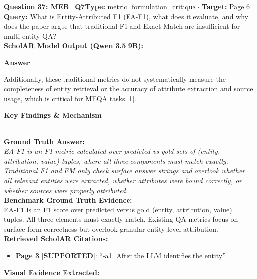 \documentclass[10pt,a4paper]{article}
\begin{document}
\begin{tcolorbox}[questionbox]
{\noindent\bfseries\large\color{navy} Question 37: MEB\_Q7}\hfill {\footnotesize\color{darkteal}\textbf{Type:} metric\_formulation\_critique $\cdot$ \textbf{Target:} Page 6}\\[4pt]
{\noindent\bfseries\color{accentblue} Query: } What is Entity-Attributed F1 (EA-F1), what does it evaluate, and why does the paper argue that traditional F1 and Exact Match are insufficient for multi-entity QA?\\[6pt]
{\noindent\bfseries\color{navy} ScholAR Model Output (Qwen 3.5 9B):}\\[2pt]
{\small \noindent \textbf{Answer}\par\vspace{3pt}Additionally, these traditional metrics do not systematically measure the completeness of entity retrieval or the accuracy of attribute extraction and source usage, which is critical for MEQA tasks [1].\par\vspace{3pt}\noindent \textbf{Key Findings \& Mechanism}}\\[6pt]
{\noindent\bfseries\color{darkteal} Ground Truth Answer:}\\[2pt]
{\small\itshape EA-F1 is an F1 metric calculated over predicted vs gold sets of (entity, attribution, value) tuples, where all three components must match exactly. Traditional F1 and EM only check surface answer strings and overlook whether all relevant entities were extracted, whether attributes were bound correctly, or whether sources were properly attributed.}\\[4pt]
{\noindent\bfseries\color{darkteal} Benchmark Ground Truth Evidence:}\\[2pt]
{\footnotesize EA-F1 is an F1 score over predicted versus gold (entity, attribution, value) tuples. All three elements must exactly match. Existing QA metrics focus on surface-form correctness but overlook granular entity-level attribution.}\\[4pt]
{\noindent\bfseries\color{navy} Retrieved ScholAR Citations:}\\[2pt]
\begin{itemize}\setlength\itemsep{1pt}
\item {\footnotesize \textbf{Page 3} [{\color{passgreen}\textbf{SUPPORTED}}]: ``-a1. After the LLM identifies the entity''}
\end{itemize}
\vspace{4pt}
{\noindent\bfseries\color{navy} Visual Evidence Extracted:}\\[4pt]

\end{tcolorbox}
\end{document}

